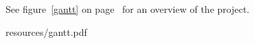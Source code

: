 \label{project-outline}
See figure~\ref{gantt} on page~\pageref{gantt} for an overview of the project.


{resources/gantt.pdf}

